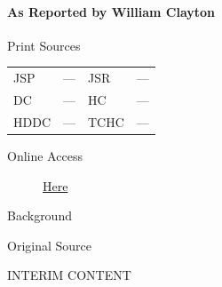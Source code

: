 			\paragraph{As Reported by William Clayton}
				\label{EMS-1843-JS-16-MAY-1843-WC}
			
				\begin{description}
					\item[Print Sources]
				\end{description}

					\begin{tabular}{p{0.5in}p{1in}p{0.5in}p{1in}}
					JSP	 	& ---		& JSR 		& --- \\
					DC	 	& ---		& HC 		& --- \\
					HDDC 	& ---		& TCHC 		& --- \\
					\end{tabular}
				
				\begin{description}
					\item[Online Access] \href{https://www.josephsmithpapers.org/paper-summary/instruction-16-may-1843-as-reported-by-william-clayton/1}{Here}
				\end{description}
				
				\begin{description}
					\item[Background]
				\end{description}
				
				
				\begin{description}
					\item[Original Source]
				\end{description}
				
					INTERIM CONTENT
				
				
